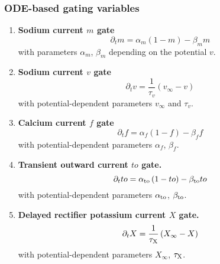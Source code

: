 \documentclass{scrartcl}
\begin{document}
\subsubsection{ODE-based gating variables}
\begin{enumerate}
\item {\bf Sodium current $m$ gate}
\begin{equation}
	\partial_t m = \alpha_m \left(1 - m \right) - \beta_m m
\end{equation}
with parameters $\alpha_m$, $\beta_m$ depending on the potential $v$.
\item {\bf Sodium current $v$ gate}
\begin{equation}
	\partial_t v = \frac{1}{\tau_v} \left( v_{\infty} - v \right)
\end{equation}
with potential-dependent parameters $v_{\infty}$ and $\tau_v$.
\item {\bf Calcium current $f$ gate}
\begin{equation}
	\partial_t f = \alpha_f \left( 1 - f \right)  - \beta_f f
\end{equation}
with potential-dependent parameters $\alpha_f$, $\beta_f$.
\item {\bf Transient outward current $to$ gate.}
\begin{equation}
	\partial_t to = \alpha_{\rm to} \left(1 - to \right) - \beta_{\rm to} to
\end{equation}
with potential-dependent parameters $\alpha_{\rm to}$, $\beta_{\rm to}$.
\item {\bf Delayed rectifier potassium current $X$ gate.}
\begin{equation}
	\partial_t X = \frac{1}{\tau_{\rm X}} \left( X_{\infty} - X \right)
\end{equation}
with potential-dependent parameters $X_{\infty}$, $\tau_{\rm X}$.
\end{enumerate}
\end{document}
